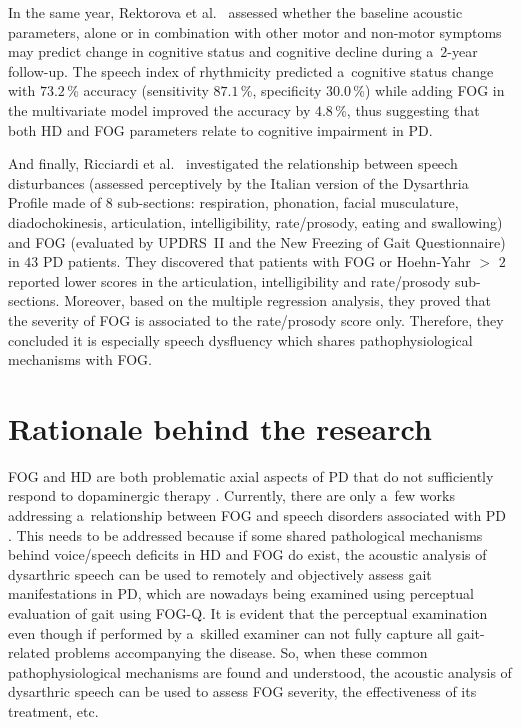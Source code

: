 In the same year, Rektorova et al.~\cite{Rektorova2016} assessed whether the baseline acoustic parameters, alone or in combination with other motor and non-motor symptoms may predict change in cognitive status and cognitive decline during a~$2$-year follow-up. The speech index of rhythmicity predicted a~cognitive status change with $73.2$\,\% accuracy (sensitivity $87.1$\,\%, specificity $30.0$\,\%) while adding FOG in the multivariate model improved the accuracy by $4.8$\,\%, thus suggesting that both HD and FOG parameters relate to cognitive impairment in PD.

And finally, Ricciardi et al.~\cite{Ricciardi2016} investigated the relationship between speech disturbances (assessed perceptively by the Italian version of the Dysarthria Profile made of $8$ sub-sections: respiration, phonation, facial musculature, diadochokinesis, articulation, intelligibility, rate/prosody, eating and swallowing) and FOG (evaluated by UPDRS~II and the New Freezing of Gait Questionnaire) in $43$ PD patients. They discovered that patients with FOG or Hoehn-Yahr $>$ $2$ reported lower scores in the articulation, intelligibility and rate/prosody sub-sections. Moreover, based on the multiple regression analysis, they proved that the severity of FOG is associated to the rate/prosody score only. Therefore, they concluded it is especially speech dysfluency which shares pathophysiological mechanisms with FOG.

\section{Rationale behind the research}
\label{ch6_2}

FOG and HD are both problematic axial aspects of PD that do not sufficiently respond to dopaminergic therapy \cite{Pederson1991, Azulay1996, Varanese2010, Eliasova2013}. Currently, there are only a~few works addressing a~relationship between FOG and speech disorders associated with PD \cite{Giladi2001b, Bartels2003, Moreau2007, Cantiniaux2010, Park2014}. This needs to be addressed because if some shared pathological mechanisms behind voice/speech deficits in HD and FOG do exist, the acoustic analysis of dysarthric speech can be used to remotely and objectively assess gait manifestations in PD, which are nowadays being examined using perceptual evaluation of gait using FOG-Q. It is evident that the perceptual examination even though if performed by a~skilled examiner can not fully capture all gait-related problems accompanying the disease. So, when these common pathophysiological mechanisms are found and understood, the acoustic analysis of dysarthric speech can be used to assess FOG severity, the effectiveness of its treatment, etc.


